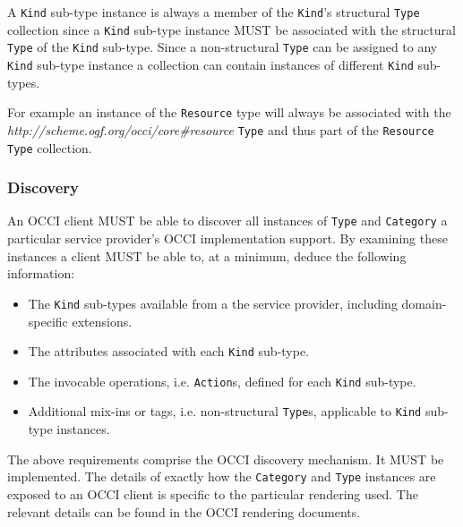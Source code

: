 \documentclass[10pt,a4paper,british]{article}
\newcommand{\hl}{\texttt}
\begin{document}
A \hl{Kind} sub-type instance is always a member of the \hl{Kind}'s structural
\hl{Type} collection since a \hl{Kind} sub-type instance MUST be associated
with the structural \hl{Type} of the \hl{Kind} sub-type.
Since a non-structural \hl{Type} can be assigned to any \hl{Kind} sub-type
instance a collection can contain instances of different \hl{Kind} sub-types.

For example an instance of the \hl{Resource} type will always be associated
with the \textit{http://scheme.ogf.org/occi/core\#resource} \hl{Type} and thus
part of the \hl{Resource} \hl{Type} collection.

\subsubsection{Discovery}
\label{sec:discovery}
An OCCI client MUST be able to discover all instances of \hl{Type} and
\hl{Category} a particular service provider's OCCI implementation support. By
examining these instances a client MUST be able to, at a minimum, deduce the
following information:
\begin{itemize}
\item The \hl{Kind} sub-types available from a the service provider, including domain-specific extensions.
\item The attributes associated with each \hl{Kind} sub-type.
\item The invocable operations, i.e. \hl{Action}s, defined for each \hl{Kind} sub-type.
\item Additional mix-ins or tags, i.e. non-structural \hl{Type}s, applicable to
 \hl{Kind} sub-type instances.
\end{itemize}
The above requirements comprise the OCCI discovery mechanism. It MUST be
implemented.
%
The details of exactly how the \hl{Category} and \hl{Type} instances are
exposed to an OCCI client is specific to the particular rendering used.
The relevant details can be found in the OCCI rendering documents.

\end{document}
